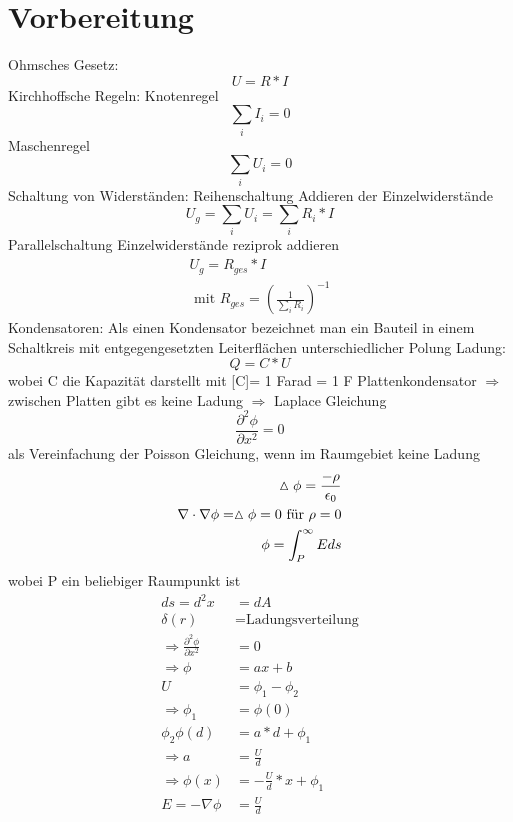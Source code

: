 \documentclass[10pt,a4paper]{article}
\begin{document}
\maketitle
\section{Vorbereitung}
Ohmsches Gesetz:  
\begin{equation}
U=R*I
\end{equation}
Kirchhoffsche Regeln: 
Knotenregel	
\begin{equation} \sum_{i}{I_i}=0 \end{equation} 
Maschenregel 
\begin{equation}\sum_{i}{U_i}=0\end{equation} 
Schaltung von Widerständen: 
Reihenschaltung
Addieren der Einzelwiderstände
\begin{equation}
U_g=\sum_{i}{U_i}=\sum_{i}{R_i*I}
\end{equation}
Parallelschaltung
Einzelwiderstände reziprok addieren  
\begin{align}
U_g=R_{ges}*I \\ 
\text{  mit  } R_{ges}=(\frac{1}{\sum_{i}{R_i}})^{-1}
\end{align}
Kondensatoren:
Als einen Kondensator bezeichnet man ein Bauteil in einem Schaltkreis mit entgegengesetzten Leiterflächen
unterschiedlicher Polung
Ladung: 
\begin{equation}
Q=C*U
\end{equation}
wobei C die Kapazität darstellt mit [C]= 1 Farad = 1 F
Plattenkondensator
$\Rightarrow$ zwischen Platten gibt es keine Ladung
$\Rightarrow$ Laplace Gleichung  
\begin{equation}
\frac{\partial^2 \phi}{\partial x^2}=0
\end{equation}
als Vereinfachung der Poisson Gleichung, wenn im Raumgebiet keine Ladung 
\begin{align}
\vartriangle \phi =\frac{-\rho}{\epsilon_0} \notag \\
\nabla \cdot \nabla \phi =\vartriangle \phi = 0 \text{ für } \rho = 0 \\
\phi = \int _P^\infty E ds
\end{align}
wobei P ein beliebiger Raumpunkt ist
\begin{align}
ds=d^2x&=dA \\
\delta(r)&=\text{Ladungsverteilung} \\
\Rightarrow \frac{\partial^2\phi}{\partial x^2}&=0\\
\Rightarrow \phi&=ax+b \\
U&=\phi_1-\phi_2 \\
\Rightarrow \phi_1&=\phi(0)\\
\phi_2\phi(d)&=a*d+\phi_1 \\ \Rightarrow a&=\frac{U}{d} \\
\Rightarrow\phi(x)&=-\frac{U}{d}*x+\phi_1 \\
E=-\nabla \phi&=\frac{U}{d}
\end{align}
\end{document}
